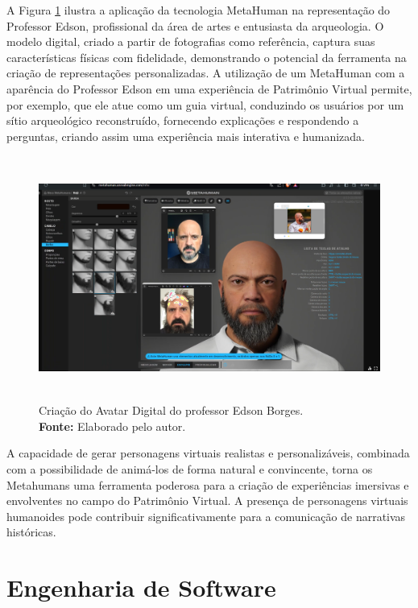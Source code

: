 A Figura \ref{fig:metahumanEdson} ilustra a aplicação da tecnologia MetaHuman na representação do Professor Edson, profissional da área de artes e entusiasta da arqueologia. O modelo digital, criado a partir de fotografias como referência, captura suas características físicas com fidelidade, demonstrando o potencial da ferramenta na criação de representações personalizadas. A utilização de um MetaHuman com a aparência do Professor Edson em uma experiência de Patrimônio Virtual permite, por exemplo, que ele atue como um guia virtual, conduzindo os usuários por um sítio arqueológico reconstruído, fornecendo explicações e respondendo a perguntas, criando assim uma experiência mais interativa e humanizada.

\begin{figure}[H]
    \centering
    \includegraphics[height=8cm, keepaspectratio]{img/Metahuman.png}
    \caption{Criação do Avatar Digital do professor Edson Borges. \\
        \textbf{Fonte:} Elaborado pelo autor.}
    \label{fig:metahumanEdson}
\end{figure}



A capacidade de gerar personagens virtuais realistas e personalizáveis, combinada com a possibilidade de animá-los de forma natural e convincente, torna os Metahumans uma ferramenta poderosa para a criação de experiências imersivas e envolventes no campo do Patrimônio Virtual. A presença de personagens virtuais humanoides pode contribuir significativamente para a comunicação de narrativas históricas.

\section{Engenharia de Software}

